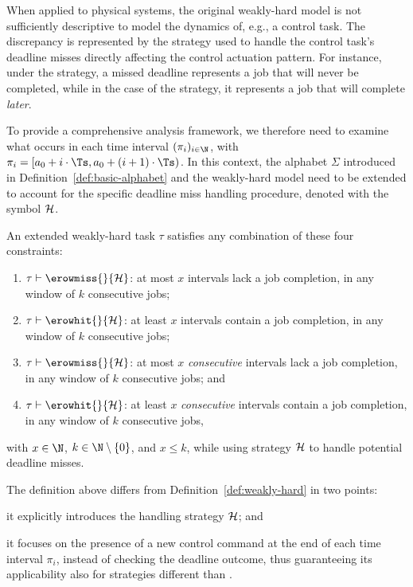 When applied to physical systems, the original weakly-hard model is not sufficiently descriptive to model the dynamics of, e.g., a control task.
The discrepancy is represented by the strategy used to handle the control task's deadline misses directly affecting the control actuation pattern.
For instance, under the \tK{} strategy, a missed deadline represents a job that will never be completed, while in the case of the \tS{} strategy, it represents a job that will complete \emph{later}.

To provide a comprehensive analysis framework, we therefore need to examine what occurs in each time interval $(\pi_i)_{i \in \N}$, with $\pi_i = [a_0 + i\cdot \Ts, a_0 + (i+1)\cdot \Ts)$. 
In this context, the alphabet $\Sigma$ introduced in Definition~\ref{def:basic-alphabet} and the weakly-hard model need to be extended to account for the specific deadline miss handling procedure, denoted with the symbol $\mathcal{H}$.

\begin{definition}%
    \label{def:new-mk}%
    An extended weakly-hard task $\tau$ satisfies any combination of these four constraints:
    \begin{enumerate}[label=(\roman*)]
        \item $\tau \vdash \erowmiss{}{\strat}$: at most $x$ intervals lack a job completion, in any window of $k$ consecutive jobs;
        \item $\tau \vdash \erowhit{}{\strat}$: at least $x$ intervals contain a job completion, in any window of $k$ consecutive jobs;
        \item $\tau \vdash \erowmiss{}{\strat}$: at most $x$ \emph{consecutive} intervals lack a job completion, in any window of $k$ consecutive jobs; and
        \item $\tau \vdash \erowhit{}{\strat}$: at least $x$ \emph{consecutive} intervals contain a job completion, in any window of $k$ consecutive jobs,
    \end{enumerate}
    with $x\in \N$, $k \in \N\setminus \left\{ 0 \right\}$, and $x\leq k$, while using strategy $\mathcal{H}$ to handle potential deadline misses.
\end{definition}

The definition above differs from Definition~\ref{def:weakly-hard} in two points:
\begin{enumerate*}[label=(\roman*)]
    \item it explicitly introduces the handling strategy $\mathcal{H}$; and
    \item it focuses on the presence of a new control command at the end of each time interval $\pi_i$, instead of checking the deadline outcome, thus guaranteeing its applicability also for strategies different than \tK{}.
\end{enumerate*}

